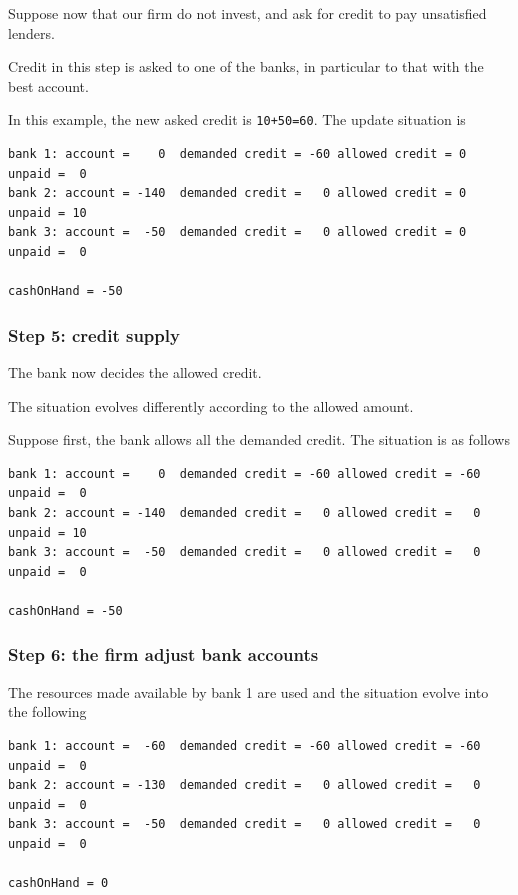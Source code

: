 \documentclass{article}
\begin{document}
Suppose now that our firm do not invest, and ask for credit to pay unsatisfied lenders.

Credit in this step is asked to one of the banks, in particular to that with the best account.

In this example, the new asked credit is \verb/10+50=60/. The update situation is 

\begin{verbatim}
bank 1: account =    0  demanded credit = -60 allowed credit = 0 unpaid =  0
bank 2: account = -140  demanded credit =   0 allowed credit = 0 unpaid = 10
bank 3: account =  -50  demanded credit =   0 allowed credit = 0 unpaid =  0

cashOnHand = -50
\end{verbatim}






\subsubsection*{Step 5: credit supply}

The bank now decides the allowed credit.

The situation evolves differently according to the allowed amount.

Suppose first, the bank allows all the demanded credit. The situation is as follows

\begin{verbatim}
bank 1: account =    0  demanded credit = -60 allowed credit = -60 unpaid =  0
bank 2: account = -140  demanded credit =   0 allowed credit =   0 unpaid = 10
bank 3: account =  -50  demanded credit =   0 allowed credit =   0 unpaid =  0

cashOnHand = -50
\end{verbatim}

\subsubsection*{Step 6: the firm adjust bank accounts}

The resources made available by bank 1 are used and the situation evolve into the following

\begin{verbatim}
bank 1: account =  -60  demanded credit = -60 allowed credit = -60 unpaid =  0
bank 2: account = -130  demanded credit =   0 allowed credit =   0 unpaid =  0
bank 3: account =  -50  demanded credit =   0 allowed credit =   0 unpaid =  0

cashOnHand = 0
\end{verbatim}
\end{document}
